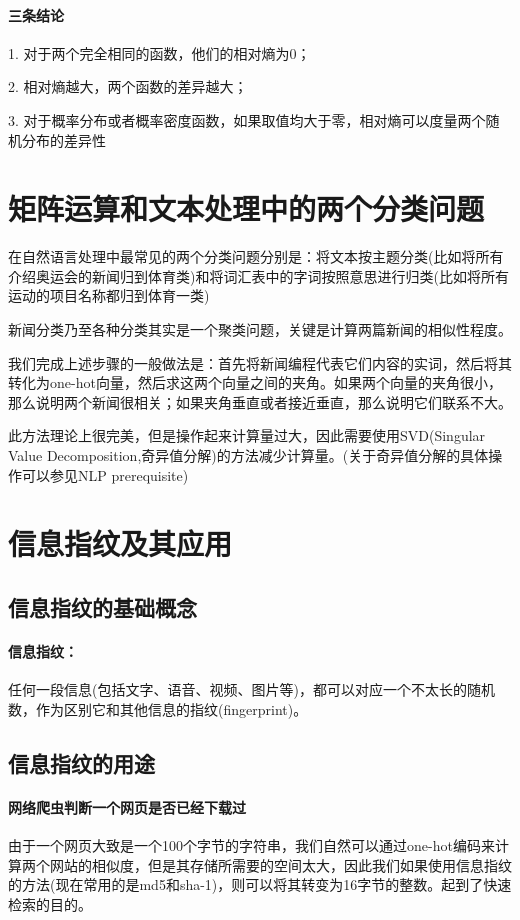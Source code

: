 \documentclass[UTF8]{article}
\begin{document}
	\paragraph{三条结论}

	1. 对于两个完全相同的函数，他们的相对熵为0；

	2. 相对熵越大，两个函数的差异越大；

	3. 对于概率分布或者概率密度函数，如果取值均大于零，相对熵可以度量两个随机分布的差异性

	\section{矩阵运算和文本处理中的两个分类问题}
	在自然语言处理中最常见的两个分类问题分别是：将文本按主题分类(比如将所有介绍奥运会的新闻归到体育类)和将词汇表中的字词按照意思进行归类(比如将所有运动的项目名称都归到体育一类)

	新闻分类乃至各种分类其实是一个聚类问题，关键是计算两篇新闻的相似性程度。

	我们完成上述步骤的一般做法是：首先将新闻编程代表它们内容的实词，然后将其转化为one-hot向量，然后求这两个向量之间的夹角。如果两个向量的夹角很小，那么说明两个新闻很相关；如果夹角垂直或者接近垂直，那么说明它们联系不大。

	此方法理论上很完美，但是操作起来计算量过大，因此需要使用SVD(Singular Value Decomposition,奇异值分解)的方法减少计算量。(关于奇异值分解的具体操作可以参见NLP prerequisite)

	\section{信息指纹及其应用}
	\subsection{信息指纹的基础概念}
	\paragraph{信息指纹：} 任何一段信息(包括文字、语音、视频、图片等)，都可以对应一个不太长的随机数，作为区别它和其他信息的指纹(fingerprint)。

	\subsection{信息指纹的用途}
	\paragraph{网络爬虫判断一个网页是否已经下载过}
	由于一个网页大致是一个100个字节的字符串，我们自然可以通过one-hot编码来计算两个网站的相似度，但是其存储所需要的空间太大，因此我们如果使用信息指纹的方法(现在常用的是md5和sha-1)，则可以将其转变为16字节的整数。起到了快速检索的目的。
\end{document}
